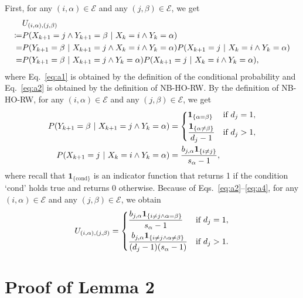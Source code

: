 First, for any $(i, \alpha) \in \mathcal{E}$ and any $(j, \beta) \in \mathcal{E}$, we get
\begin{align}
&U_{(i, \alpha), (j, \beta)} \notag \\
\coloneq &P(X_{k+1} = j \land Y_{k+1} = \beta\ |\ X_k = i \land Y_k = \alpha) \notag \\
= &P(Y_{k+1} = \beta\ |\ X_{k+1} = j \land X_k = i \land Y_k = \alpha) P(X_{k+1} = j\ |\ X_k = i \land Y_k = \alpha) \label{eq:a1} \\
= &P(Y_{k+1} = \beta\ |\ X_{k+1} = j \land Y_k = \alpha) P(X_{k+1} = j\ |\ X_k = i \land Y_k = \alpha), \label{eq:a2}
\end{align}
where Eq.~\eqref{eq:a1} is obtained by the definition of the conditional probability and Eq.~\eqref{eq:a2} is obtained by the definition of NB-HO-RW.
By the definition of NB-HO-RW, for any $(i, \alpha) \in \mathcal{E}$ and any $(j, \beta) \in \mathcal{E}$, we get
\begin{align}
P(Y_{k+1} = \beta\ |\ X_{k+1} = j \land Y_k = \alpha) &= 
\begin{dcases}
\bm{1}_{\{\alpha = \beta\}} & \text{if $d_j = 1$}, \\
\frac{\bm{1}_{\{\alpha \neq \beta\}}}{d_j-1} & \text{if $d_j > 1$},
\end{dcases} \label{eq:a3} \\
P(X_{k+1} = j\ |\ X_k = i \land Y_k = \alpha) &= \frac{b_{j, \alpha} \bm{1}_{\{i \neq j\}}}{s_{\alpha} - 1}, \label{eq:a4}
\end{align}
where recall that $\bm{1}_{\{\text{cond}\}}$ is an indicator function that returns 1 if the condition `cond' holds true and returns 0 otherwise.
Because of Eqs.~\eqref{eq:a2}--\eqref{eq:a4}, for any $(i, \alpha) \in \mathcal{E}$ and any $(j, \beta) \in \mathcal{E}$, we obtain 
\begin{align*}
U_{(i, \alpha), (j, \beta)} =
\begin{dcases}
\frac{b_{j, \alpha} \bm{1}_{\{i \neq j \land \alpha = \beta\}}}{s_{\alpha} - 1}    &   \text{if $d_j = 1$}, \\
\frac{b_{j, \alpha} \bm{1}_{\{i \neq j \land \alpha \neq \beta\}}}{(d_j-1)(s_{\alpha} - 1)} &   \text{if $d_j > 1$}.
\end{dcases}
\end{align*}

\section{Proof of Lemma 2} \label{appendix:b}

